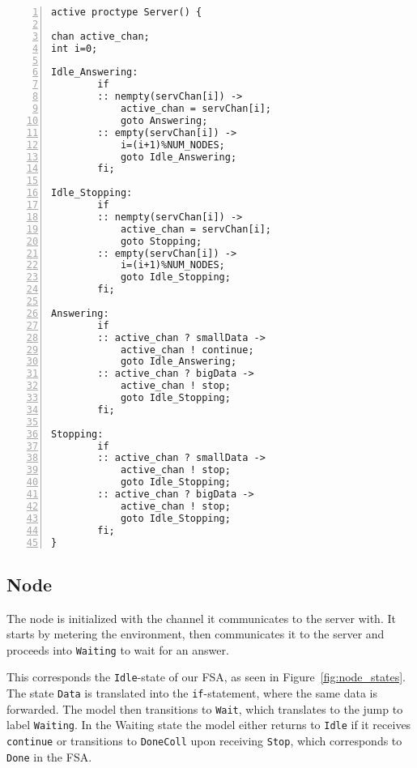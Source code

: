 \begin{lstlisting}[caption={Server code},language=Promela, numbers=left, basicstyle=\footnotesize, tabsize=2]
active proctype Server() {
   
chan active_chan;
int i=0;

Idle_Answering: 
        if
        :: nempty(servChan[i]) -> 
            active_chan = servChan[i];
            goto Answering; 
        :: empty(servChan[i]) ->
            i=(i+1)%NUM_NODES;
            goto Idle_Answering;
        fi;

Idle_Stopping:
        if
        :: nempty(servChan[i]) -> 
            active_chan = servChan[i]; 
            goto Stopping; 
        :: empty(servChan[i]) ->
            i=(i+1)%NUM_NODES;
            goto Idle_Stopping;
        fi;

Answering: 
        if
        :: active_chan ? smallData -> 
            active_chan ! continue; 
            goto Idle_Answering;
        :: active_chan ? bigData ->
            active_chan ! stop;
            goto Idle_Stopping;
        fi;

Stopping:    
        if
        :: active_chan ? smallData -> 
            active_chan ! stop; 
            goto Idle_Stopping;
        :: active_chan ? bigData ->
            active_chan ! stop;
            goto Idle_Stopping;
        fi;
}
\end{lstlisting}

\subsection{Node}

The node is initialized with the channel it communicates to the server with. It starts by metering the environment, then communicates it to the server and proceeds into \texttt{Waiting} to wait for an answer. 

This corresponds the \texttt{Idle}-state of our FSA, as seen in Figure~\ref{fig:node_states}. The state \texttt{Data} is translated into the \texttt{if}-statement, where the same data is forwarded. The model then transitions to \texttt{Wait}, which translates to the jump to label \texttt{Waiting}. In the Waiting state the model either returns to \texttt{Idle} if it receives \texttt{continue} or transitions to \texttt{DoneColl} upon receiving \texttt{Stop}, which corresponds to \texttt{Done} in the FSA.


